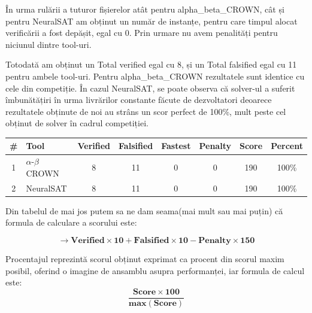\hspace{0.5 cm}
În urma rulării a tuturor fișierelor atât pentru alpha\_beta\_CROWN, cât și pentru NeuralSAT am obținut un număr de instanțe, pentru care timpul alocat verificării a fost depășit, egal cu 0. Prin urmare nu avem penalități pentru niciunul dintre tool-uri.

Totodată am obținut un Total verified egal cu 8, și un Total falsified egal cu 11 pentru ambele tool-uri. Pentru alpha\_beta\_CROWN rezultatele sunt identice cu cele din competiție. În cazul NeuralSAT, se poate observa că solver-ul
a suferit îmbunătățiri în urma livrărilor constante făcute de dezvoltatori deoarece rezultatele obținute de noi au strâns un scor perfect de 100\%, mult peste cel obținut de solver în cadrul competiției.

\begin{table}[h]
\centering
\begin{tabular}{clcccccc}
\hline
\# & Tool & Verified & Falsified & Fastest & Penalty & Score & Percent \\ \hline
1 & \(\alpha\)-\(\beta\) CROWN & 8 & 11 & 0 & 0 & 190 & 100\% \\
2 & NeuralSAT & 8 & 11 & 0 & 0 & 190 & 100\% \\ \hline
\end{tabular}
\end{table}

Din tabelul de mai jos putem sa ne dam seama(mai mult sau mai puțin) că formula de calculare a scorului este: 

\[
\mathbf{\rightarrow \textbf{Verified} \times 10 + \textbf{Falsified} \times 10 - \textbf{Penalty} \times 150}
\]


Procentajul reprezintă scorul obținut exprimat ca procent din scorul maxim
posibil, oferind o imagine de ansamblu asupra performanței, iar formula de calcul
este:
\[
\mathbf{\frac{\textbf{Score} \times 100}{\textbf{max}(\textbf{Score})}}
\]

